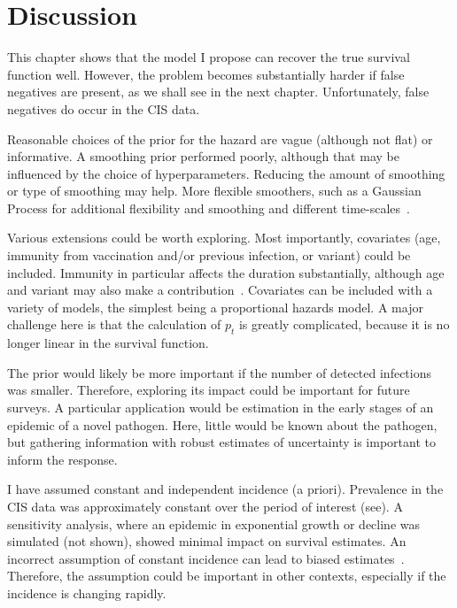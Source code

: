 \documentclass[thesis.tex]{subfiles}
\begin{document}
\section{Discussion} \label{perf-test:sec:discussion}

This chapter shows that the model I propose can recover the true survival function well.
However, the problem becomes substantially harder if false negatives are present, as we shall see in the next chapter.
Unfortunately, false negatives do occur in the CIS data.

Reasonable choices of the prior for the hazard are vague (although not flat) or informative.
A smoothing prior performed poorly, although that may be influenced by the choice of hyperparameters.
Reducing the amount of smoothing or type of smoothing may help.
More flexible smoothers, such as a Gaussian Process for additional flexibility and smoothing and different time-scales~\autocite{saulGaussian}.

Various extensions could be worth exploring.
Most importantly, covariates (\eg age, immunity from vaccination and/or previous infection, or variant) could be included.
Immunity in particular affects the duration substantially, although age and variant may also make a contribution~\autocite{hakkiOnset,russellWithinhost}.
Covariates can be included with a variety of models, the simplest being a proportional hazards model.
A major challenge here is that the calculation of $p_t$ is greatly complicated, because it is no longer linear in the survival function.

The prior would likely be more important if the number of detected infections was smaller.
Therefore, exploring its impact could be important for future surveys.
A particular application would be estimation in the early stages of an epidemic of a novel pathogen.
Here, little would be known about the pathogen, but gathering information with robust estimates of uncertainty is important to inform the response.

I have assumed constant and independent incidence (a priori).
Prevalence in the CIS data was approximately constant over the period of interest (see).
A sensitivity analysis, where an epidemic in exponential growth or decline was simulated (not shown), showed minimal impact on survival estimates.
An incorrect assumption of constant incidence can lead to biased estimates~\autocite{degruttolaAnalysis}.
Therefore, the assumption could be important in other contexts, especially if the incidence is changing rapidly.
\end{document}
